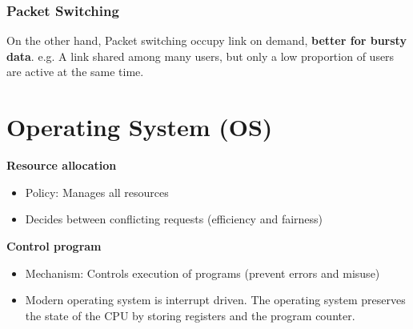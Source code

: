\documentclass[a4paper]{article}
\begin{document}
\subsubsection{Packet Switching}
On the other hand, Packet switching occupy link on demand, \textbf{better for bursty data}. e.g. A link shared among many users, but only a low proportion of users are active at the same time.
\newpage
\section{Operating System (OS)}
\textbf{Resource allocation}
\begin{itemize}
	\item Policy: Manages all resources
	\item Decides between conflicting requests (efficiency and fairness)
\end{itemize}
\textbf{Control program}
\begin{itemize}
	\item Mechanism: Controls execution of programs (prevent errors and misuse)
	\item Modern operating system is interrupt driven. The operating system preserves the state of the CPU by storing registers and the program counter.
\end{itemize}
\end{document}
